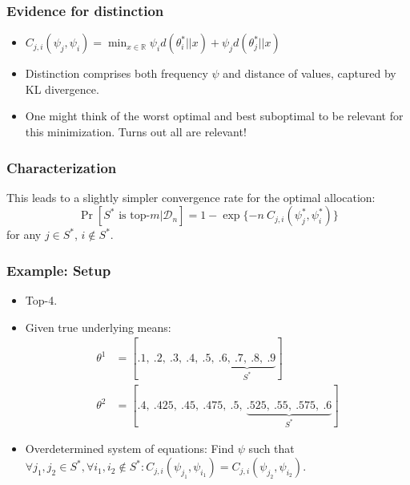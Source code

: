 \documentclass[aspectratio=43]{beamer}
\begin{document}
\begin{frame}
\frametitle{Evidence for distinction}
\begin{itemize}
  \item $C_{j, i}(\psi_j, \psi_i) = \min_{x \in \mathbb{R}} \psi_i d(\theta^*_i
      || x) + \psi_j d(\theta^*_j || x)$
  \item Distinction comprises both frequency $\psi$ and distance of values,
      captured by KL divergence.
  \item One might think of the worst optimal and best suboptimal to be relevant
      for this minimization. Turns out all are relevant!
\end{itemize}
\end{frame}

\begin{frame}
\frametitle{Characterization}
  This leads to a slightly simpler convergence rate for the optimal allocation:
  \[\Pr[S^* \text{ is top-}m |
      \mathcal{D}_n] = 1 - \exp\{-n\ C_{j, i}(\psi^*_j, \psi^*_i)\}\]
  for any $j \in S^*$, $i \notin S^*$.
\end{frame}

\begin{frame}
\frametitle{Example: Setup}
\begin{itemize}
  \item Top-4.
  \item Given true underlying means:
    \begin{align}
      \theta^1 &= [.1,\ .2,\ .3,\ .4,\ .5,\ \underbrace{.6,\ .7,\ .8,\
    .9}_\text{$S^*$}] \\
      \theta^2 &= [.4,\ .425,\ .45,\ .475,\ .5,\ \underbrace{.525,\ .55,\
    .575,\ .6}_\text{$S^*$}]
    \end{align}
  \item Overdetermined system of equations: Find $\psi$ such that $\forall j_1,
    j_2 \in S^*, \forall i_1, i_2 \notin S^*: C_{j, i}(\psi_{j_1}, \psi_{i_1})
    = C_{j, i}(\psi_{j_2}, \psi_{i_2})$.
\end{itemize}
\end{frame}
\end{document}
